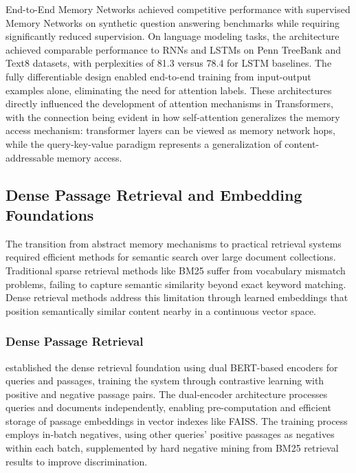 \documentclass[11pt,letterpaper]{article}
\begin{document}
End-to-End Memory Networks achieved competitive performance with supervised Memory Networks on synthetic question answering benchmarks while requiring significantly reduced supervision. On language modeling tasks, the architecture achieved comparable performance to RNNs and LSTMs on Penn TreeBank and Text8 datasets, with perplexities of 81.3 versus 78.4 for LSTM baselines. The fully differentiable design enabled end-to-end training from input-output examples alone, eliminating the need for attention labels. These architectures directly influenced the development of attention mechanisms in Transformers, with the connection being evident in how self-attention generalizes the memory access mechanism: transformer layers can be viewed as memory network hops, while the query-key-value paradigm represents a generalization of content-addressable memory access.

\subsection{Dense Passage Retrieval and Embedding Foundations}

The transition from abstract memory mechanisms to practical retrieval systems required efficient methods for semantic search over large document collections. Traditional sparse retrieval methods like BM25 suffer from vocabulary mismatch problems, failing to capture semantic similarity beyond exact keyword matching. Dense retrieval methods address this limitation through learned embeddings that position semantically similar content nearby in a continuous vector space.

\subsubsection{Dense Passage Retrieval}

\cite{karpukhin2020dense} established the dense retrieval foundation using dual BERT-based encoders for queries and passages, training the system through contrastive learning with positive and negative passage pairs. The dual-encoder architecture processes queries and documents independently, enabling pre-computation and efficient storage of passage embeddings in vector indexes like FAISS. The training process employs in-batch negatives, using other queries' positive passages as negatives within each batch, supplemented by hard negative mining from BM25 retrieval results to improve discrimination.
\end{document}
